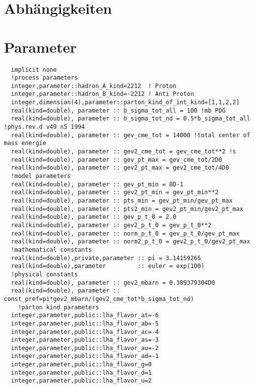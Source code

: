 \section{Abhängigkeiten}
\section{Parameter}
\begin{Verbatim}
  implicit none
  !process parameters
  integer,parameter::hadron_A_kind=2212  ! Proton
  integer,parameter::hadron_B_kind=-2212 ! Anti Proton
  integer,dimension(4),parameter::parton_kind_of_int_kind=[1,1,2,2]
  real(kind=double), parameter :: b_sigma_tot_all = 100 !mb PDG
  real(kind=double), parameter :: b_sigma_tot_nd = 0.5*b_sigma_tot_all !phys.rev.d v49 n5 1994
  real(kind=double), parameter :: gev_cme_tot = 14000 !total center of mass energie
  real(kind=double), parameter :: gev2_cme_tot = gev_cme_tot**2 !s
  real(kind=double), parameter :: gev_pt_max = gev_cme_tot/2D0
  real(kind=double), parameter :: gev2_pt_max = gev2_cme_tot/4D0
  !model parameters
  real(kind=double), parameter :: gev_pt_min = 8D-1
  real(kind=double), parameter :: gev2_pt_min = gev_pt_min**2
  real(kind=double), parameter :: pts_min = gev_pt_min/gev_pt_max
  real(kind=double), parameter :: pts2_min = gev2_pt_min/gev2_pt_max
  real(kind=double), parameter :: gev_p_t_0 = 2.0
  real(kind=double), parameter :: gev2_p_t_0 = gev_p_t_0**2
  real(kind=double), parameter :: norm_p_t_0 = gev_p_t_0/gev_pt_max
  real(kind=double), parameter :: norm2_p_t_0 = gev2_p_t_0/gev2_pt_max
  !mathematical constants
  real(kind=double),private,parameter :: pi = 3.14159265
  real(kind=double),parameter         :: euler = exp(1D0)
  !physical constants
  real(kind=double), parameter :: gev2_mbarn = 0.389379304D0
  real(kind=double), parameter :: const_pref=pi*gev2_mbarn/(gev2_cme_tot*b_sigma_tot_nd)
    !parton kind parameters
  integer,parameter,public::lha_flavor_at=-6
  integer,parameter,public::lha_flavor_ab=-5
  integer,parameter,public::lha_flavor_ac=-4
  integer,parameter,public::lha_flavor_as=-3
  integer,parameter,public::lha_flavor_au=-2
  integer,parameter,public::lha_flavor_ad=-1
  integer,parameter,public::lha_flavor_g=0
  integer,parameter,public::lha_flavor_d=1
  integer,parameter,public::lha_flavor_u=2

\end{Verbatim}
